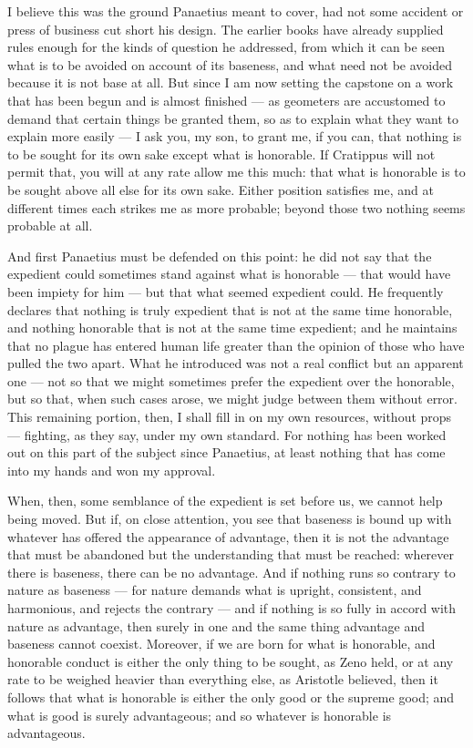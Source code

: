  I believe this was the ground Panaetius meant to cover, had not some accident or press of business cut short his design. The earlier books have already supplied rules enough for the kinds of question he addressed, from which it can be seen what is to be avoided on account of its baseness, and what need not be avoided because it is not base at all. But since I am now setting the capstone on a work that has been begun and is almost finished — as geometers are accustomed to demand that certain things be granted them, so as to explain what they want to explain more easily — I ask you, my son, to grant me, if you can, that nothing is to be sought for its own sake except what is honorable. If Cratippus will not permit that, you will at any rate allow me this much: that what is honorable is to be sought above all else for its own sake. Either position satisfies me, and at different times each strikes me as more probable; beyond those two nothing seems probable at all.

 And first Panaetius must be defended on this point: he did not say that the expedient could sometimes stand against what is honorable — that would have been impiety for him — but that what seemed expedient could. He frequently declares that nothing is truly expedient that is not at the same time honorable, and nothing honorable that is not at the same time expedient; and he maintains that no plague has entered human life greater than the opinion of those who have pulled the two apart. What he introduced was not a real conflict but an apparent one — not so that we might sometimes prefer the expedient over the honorable, but so that, when such cases arose, we might judge between them without error. This remaining portion, then, I shall fill in on my own resources, without props — fighting, as they say, under my own standard. For nothing has been worked out on this part of the subject since Panaetius, at least nothing that has come into my hands and won my approval.

 When, then, some semblance of the expedient is set before us, we cannot help being moved. But if, on close attention, you see that baseness is bound up with whatever has offered the appearance of advantage, then it is not the advantage that must be abandoned but the understanding that must be reached: wherever there is baseness, there can be no advantage. And if nothing runs so contrary to nature as baseness — for nature demands what is upright, consistent, and harmonious, and rejects the contrary — and if nothing is so fully in accord with nature as advantage, then surely in one and the same thing advantage and baseness cannot coexist. Moreover, if we are born for what is honorable, and honorable conduct is either the only thing to be sought, as Zeno held, or at any rate to be weighed heavier than everything else, as Aristotle believed, then it follows that what is honorable is either the only good or the supreme good; and what is good is surely advantageous; and so whatever is honorable is advantageous.

